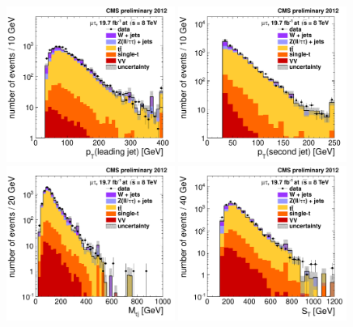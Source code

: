\begin{figure}[hbtp]
  \begin{center}
    \includegraphics[width=0.49\textwidth]{figures/mutau/mainselection/leadseljetpt.pdf}
    \includegraphics[width=0.49\textwidth]{figures/mutau/mainselection/secondseljetpt.pdf} \\
    \includegraphics[width=0.49\textwidth]{figures/mutau/mainselection/masstaub.pdf}    
    \includegraphics[width=0.49\textwidth]{figures/mutau/mainselection/st.pdf}

\end{center}
\end{figure}

